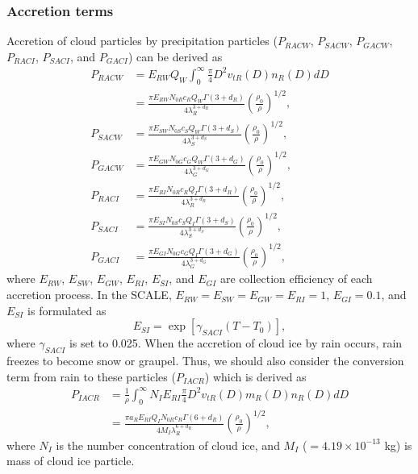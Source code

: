 \subsubsection{Accretion terms}
Accretion of cloud particles by precipitation particles ($P_{RACW}$, $P_{SACW}$, $P_{GACW}$, $P_{RACI}$, $P_{SACI}$, and $P_{GACI}$) can be derived as
\begin{align}
  P_{RACW} &=E_{RW}Q_{W}\int_{0}^{\infty}\frac{\pi}{4}D^{2}v_{tR}(D)n_{R}(D)dD \nonumber \\
  &=\frac{\pi E_{RW}N_{0R}c_{R}Q_{W}\Gamma(3+d_{R})}{4\lambda^{3+d_{R}}_{R}}\left(\frac{\rho_{0}}{\rho}\right)^{1/2}, \\
  P_{SACW} &=\frac{\pi E_{SW}N_{0S}c_{S}Q_{W}\Gamma(3+d_{S})}{4\lambda^{3+d_{S}}_{S}}\left(\frac{\rho_{0}}{\rho}\right)^{1/2}, \\
  P_{GACW} &=\frac{\pi E_{GW}N_{0G}c_{G}Q_{W}\Gamma(3+d_{G})}{4\lambda^{3+d_{G}}_{G}}\left(\frac{\rho_{0}}{\rho}\right)^{1/2}, \\
  P_{RACI} &=\frac{\pi E_{RI}N_{0R}c_{R}Q_{I}\Gamma(3+d_{R})}{4\lambda^{3+d_{R}}_{R}}\left(\frac{\rho_{0}}{\rho}\right)^{1/2}, \\
  P_{SACI} &=\frac{\pi E_{SI}N_{0S}c_{S}Q_{I}\Gamma(3+d_{S})}{4\lambda^{3+d_{S}}_{S}}\left(\frac{\rho_{0}}{\rho}\right)^{1/2}, \\
  P_{GACI} &=\frac{\pi E_{GI}N_{0G}c_{G}Q_{I}\Gamma(3+d_{G})}{4\lambda^{3+d_{G}}_{G}}\left(\frac{\rho_{0}}{\rho}\right)^{1/2},
\end{align}
where $E_{RW}$, $E_{SW}$, $E_{GW}$, $E_{RI}$, $E_{SI}$, and $E_{GI}$ are collection efficiency of each accretion process. In the SCALE, $E_{RW} = E_{SW} = E_{GW} = E_{RI} = 1$, $E_{GI} = 0.1$, and $E_{SI}$ is formulated as
\begin{equation}
  E_{SI}=\exp[\gamma_{SACI}(T-T_{0})],
\end{equation}
where $\gamma_{SACI}$ is set to 0.025. When the accretion of cloud ice by rain occurs, rain freezes to become snow or graupel. Thus, we should also consider the conversion term from rain to these particles ($P_{IACR}$) which is derived as
\begin{align}
  P_{IACR}&=\frac{1}{\rho}\int_{0}^{\infty}N_{I}E_{RI}\frac{\pi}{4}D^{2}v_{tR}(D)m_{R}(D)n_{R}(D)dD \nonumber \\
  &=\frac{\pi a_{R}E_{RI}Q_{I}N_{0R}c_{R}\Gamma(6+d_{R})}{4M_{I}\lambda^{6+d_{R}}_{R}}\left(\frac{\rho_{0}}{\rho}\right)^{1/2},
\end{align}
where $N_{I}$ is the number concentration of cloud ice, and $M_{I}$ ($=4.19\times10^{-13}$ kg) is mass of cloud ice particle.

